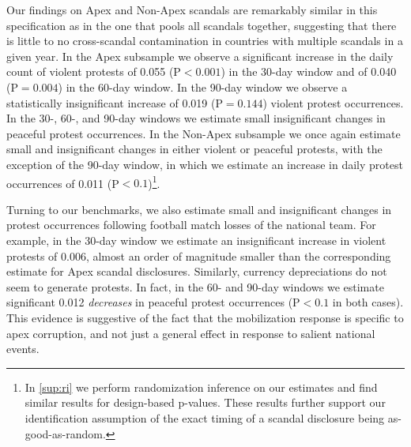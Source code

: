 \documentclass[11pt]{article}
\begin{document}
Our findings on Apex and Non-Apex scandals are remarkably similar in this specification as in the one that pools all scandals together, suggesting that there is little to no cross-scandal contamination in countries with multiple scandals in a given year. In the Apex subsample we observe a significant increase in the daily count of violent protests of 0.055 (P$<0.001$) in the 30-day window and of 0.040 (P$=0.004$) in the 60-day window. In the 90-day window we observe a statistically insignificant increase of 0.019 (P$=0.144$) violent protest occurrences. In the 30-, 60-, and 90-day windows we estimate small insignificant changes in peaceful protest occurrences. In the Non-Apex subsample we once again estimate small and insignificant changes in either violent or peaceful protests, with the exception of the 90-day window, in which we estimate an increase in daily protest occurrences of 0.011 (P$<0.1$)\footnote{In \autoref{sup:ri} we perform randomization inference on our estimates and find similar results for design-based p-values. These results further support our identification assumption of the exact timing of a scandal disclosure being as-good-as-random.}. 

Turning to our benchmarks, we also estimate small and insignificant changes in protest occurrences following football match losses of the national team. For example, in the 30-day window we estimate an insignificant increase in violent protests of 0.006, almost an order of magnitude smaller than the corresponding estimate for Apex scandal disclosures. Similarly, currency depreciations do not seem to generate protests. In fact, in the 60- and 90-day windows we estimate significant 0.012 \textit{decreases} in peaceful protest occurrences (P$<0.1$ in both cases). This evidence is suggestive of the fact that the mobilization response is specific to apex corruption, and not just a general effect in response to salient national events.
\end{document}
